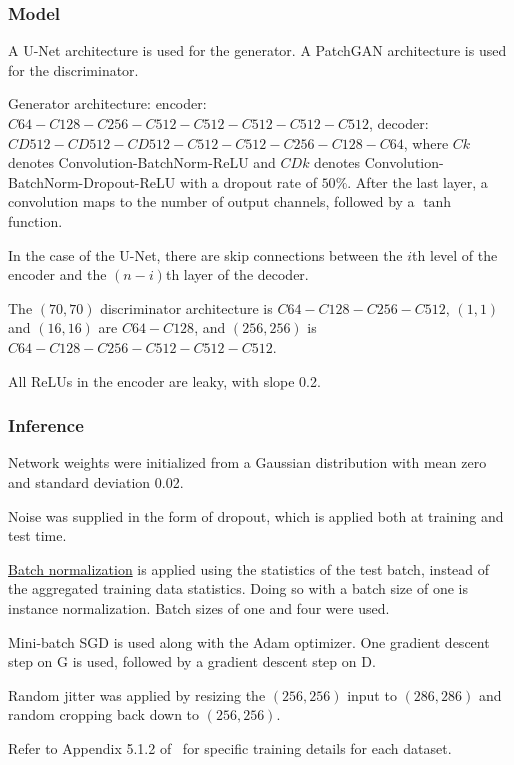 \documentclass[a4paper, 12pt]{article}
\begin{document}
\subsubsection{Model}

A U-Net\citet{DBLP:journals/corr/RonnebergerFB15} architecture is used for the
generator. A PatchGAN architecture\citet{DBLP:journals/corr/LiW16b} is used for
the discriminator.

Generator architecture: encoder: $C64-C128-C256-C512-C512-C512-C512-C512$,
decoder: $CD512-CD512-CD512-C512-C512-C256-C128-C64$, where $Ck$ denotes
Convolution-BatchNorm-ReLU and $CDk$ denotes
Convolution-BatchNorm-Dropout-ReLU with a dropout rate of $50\%$. After the
last layer, a convolution maps to the number of output channels, followed by a
$\tanh$ function.

In the case of the U-Net, there are skip connections between the $i$th level of
the encoder and the $(n - i)$th layer of the decoder.

The $(70, 70)$ discriminator architecture is $C64-C128-C256-C512$, $(1, 1)$ and
$(16, 16)$ are $C64-C128$, and $(256, 256)$ is $C64-C128-C256-C512-C512-C512$.

All ReLUs in the encoder are leaky, with slope 0.2.

\subsubsection{Inference}

Network weights were initialized from a Gaussian distribution with mean zero
and standard deviation 0.02.

Noise was supplied in the form of dropout, which is applied both at training
and test time.

\hyperref[batchnorm]{Batch normalization} is applied using the statistics of
the test batch, instead of the aggregated training data statistics. Doing so
with a batch size of one is instance
normalization\citet{DBLP:journals/corr/UlyanovVL16}. Batch sizes of one and four
were used.

Mini-batch SGD is used along with the Adam optimizer. One gradient descent step
on G is used, followed by a gradient descent step on D.

Random jitter was applied by resizing the $(256, 256)$ input to $(286, 286)$
and random cropping back down to $(256, 256)$.

Refer to Appendix 5.1.2 of~\citet{DBLP:journals/corr/IsolaZZE16} for specific
training details for each dataset.
\end{document}
